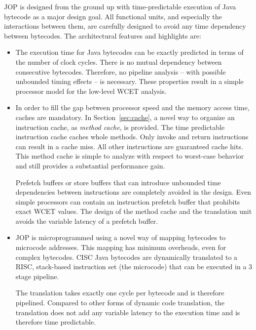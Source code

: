 JOP is designed from the ground up with time-predictable execution of
Java bytecode as a major design goal. All functional units, and
especially the interactions between them, are carefully designed to
avoid any time dependency between bytecodes. The architectural
features and highlights are:

\begin{itemize}

    \item The execution time for Java bytecodes can be exactly
        predicted in terms of the number of clock cycles. There
        is no mutual dependency between consecutive bytecodes.
        Therefore, no pipeline analysis -- with possible
        unbounded timing effects -- is necessary. These
        properties result in a simple processor model for the
        low-level WCET analysis.

    \item In order to fill the gap between processor speed and
        the memory access time, caches are mandatory. In
        Section~\ref{sec:cache}, a novel way to organize an
        instruction cache, as \emph{method cache}, is provided.
        The time predictable instruction cache caches whole
        methods. Only invoke and return instructions can result
        in a cache miss. All other instructions are guaranteed
        cache hits. This method cache is simple to analyze with
        respect to worst-case behavior and still provides a
        substantial performance gain.


Prefetch buffers or store buffers that can introduce unbounded
time dependencies between instructions are completely avoided in
the design. Even simple processors can contain an instruction
prefetch buffer that prohibits exact WCET values. The design of
the method cache and the translation unit avoids the variable
latency of a prefetch buffer.



    \item JOP is microprogrammed using a novel way of mapping
        bytecodes to microcode addresses. This mapping has
        minimum overheads, even for complex bytecodes. CISC Java
        bytecodes are dynamically translated to a RISC,
        stack-based instruction set (the microcode) that can be
        executed in a 3 stage pipeline.


The translation takes exactly one cycle per bytecode and is
therefore pipelined. Compared to other forms of dynamic code
translation, the translation does not add any variable latency to
the execution time and is therefore time predictable.


\end{itemize}
